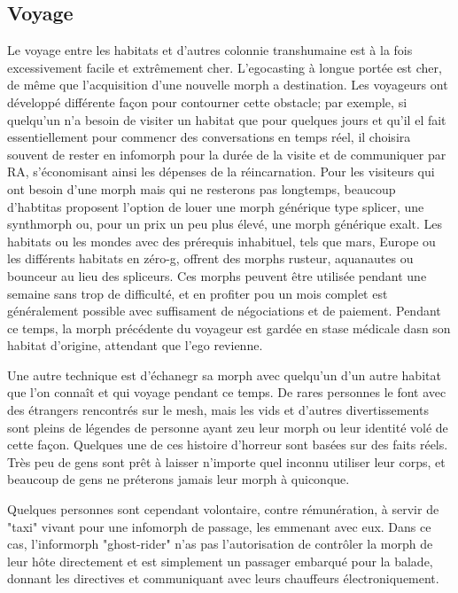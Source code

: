             \subsection{Voyage} \label{sec:travel} 

            Le voyage entre les habitats et d'autres colonnie transhumaine est à la fois excessivement facile et extrêmement cher. L'egocasting à longue portée est cher, de même que l'acquisition d'une nouvelle morph a destination. Les voyageurs ont développé différente façon pour contourner cette obstacle; par exemple, si quelqu'un n'a besoin de visiter un habitat que pour quelques jours et qu'il el fait essentiellement pour commencr des conversations en temps réel, il choisira souvent de rester en infomorph pour la durée de la visite et de communiquer par RA, s'économisant ainsi les dépenses de la réincarnation. Pour les visiteurs qui ont besoin d'une morph mais qui ne resterons pas longtemps, beaucoup d'habtitas proposent l'option de louer une morph générique type splicer, une synthmorph ou, pour un prix un peu plus élevé, une morph générique exalt. Les habitats ou les mondes avec des prérequis inhabituel, tels que mars, Europe ou les différents habitats en zéro-g, offrent des morphs rusteur, aquanautes ou bounceur au lieu des spliceurs. Ces morphs peuvent être utilisée pendant une semaine sans trop de difficulté, et en profiter pou un mois complet est généralement possible avec suffisament de négociations et de paiement. Pendant ce temps, la morph précédente du voyageur est gardée en stase médicale dasn son habitat d'origine, attendant que l'ego revienne. 

            Une autre technique est d'échanegr sa morph avec quelqu'un d'un autre habitat que l'on connaît et qui voyage pendant ce temps. De rares personnes le font avec des étrangers rencontrés sur le mesh, mais les vids et d'autres divertissements sont pleins de légendes de personne ayant zeu leur morph ou leur identité volé de cette façon. Quelques une de ces histoire d'horreur sont basées sur des faits réels. Très peu de gens sont prêt à laisser n'importe quel inconnu utiliser leur corps, et beaucoup de gens ne préterons jamais leur morph à quiconque. 

            Quelques personnes sont cependant volontaire, contre rémunération, à servir de "taxi" vivant pour une infomorph de passage, les emmenant avec eux. Dans ce cas, l'informorph "ghost-rider" n'as pas l'autorisation de contrôler la morph de leur hôte directement et est simplement un passager embarqué pour la balade, donnant les directives et communiquant avec leurs chauffeurs électroniquement. 

